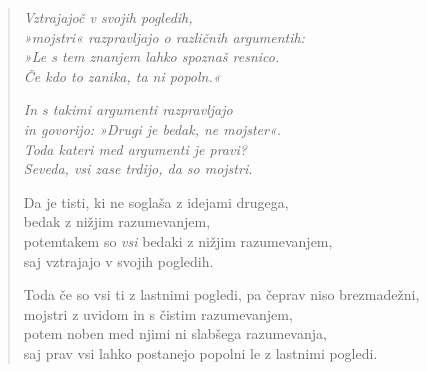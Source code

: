 \begin{verse}


\emph{Vztrajajoč v svojih pogledih,}\\
\emph{»mojstri« razpravljajo o različnih argumentih:}\\
\emph{»Le s tem znanjem lahko spoznaš resnico.}\\
\emph{Če kdo to zanika, ta ni popoln.«}

\emph{In s takimi argumenti razpravljajo}\\
\emph{in govorijo: »Drugi je bedak, ne mojster«.}\\
\emph{Toda kateri med argumenti je pravi?}\\
\emph{Seveda, vsi zase trdijo, da so mojstri.}

Da je tisti, ki ne soglaša z idejami drugega,\\
bedak z nižjim razumevanjem,\\
potemtakem so \emph{vsi} bedaki z nižjim razumevanjem,\\
saj vztrajajo v svojih pogledih.

Toda če so vsi ti z lastnimi pogledi, pa čeprav niso brezmadežni,\\
mojstri z uvidom in s čistim razumevanjem,\\
potem noben med njimi ni slabšega razumevanja,\\
saj prav vsi lahko postanejo popolni le z lastnimi pogledi.

\end{verse}


